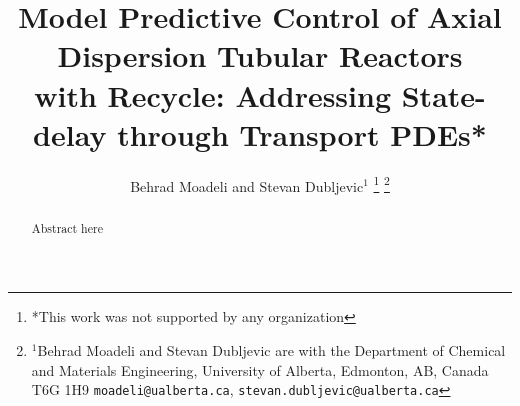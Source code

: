\documentclass[letterpaper, 10 pt, conference]{ieeeconf}  %
\title{\LARGE \bf
Model Predictive Control of Axial Dispersion Tubular Reactors\\ with Recycle: Addressing State-delay through Transport PDEs*
}
\author{Behrad Moadeli and Stevan Dubljevic$^{1}$%
\thanks{*This work was not supported by any organization}%
\thanks{$^{1}$Behrad Moadeli and Stevan Dubljevic are with the Department of Chemical and Materials Engineering,
         University of Alberta, Edmonton, AB, Canada T6G 1H9
        {\tt\small moadeli@ualberta.ca}, {\tt\small stevan.dubljevic@ualberta.ca}}%
}
\begin{document}
\maketitle
\thispagestyle{empty}
\pagestyle{empty}


\begin{abstract}

Abstract here

\end{abstract}





\end{document}
